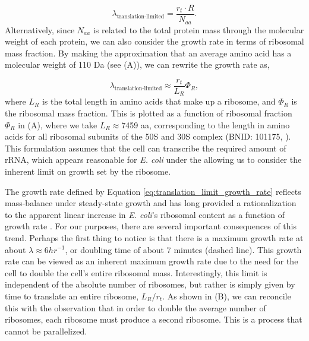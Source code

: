 \begin{equation}
\lambda_{\textrm{translation-limited}} = \frac{r_t \cdot R}{N_{aa}}.
\end{equation}
Alternatively, since $N_{aa}$ is related to the total protein mass through the
molecular weight of each protein, we can also consider the growth rate in terms
of ribosomal mass fraction. By making the approximation that an average amino
acid has a molecular weight of 110 Da (see (A)), we can
rewrite the growth rate as,

\begin{equation}
\lambda_{\textrm{translation-limited}} \approx \frac{r_t}{L_R}  \Phi_R,
\label{eq:translation_limit_growth_rate}
\end{equation}
where $L_R$ is the total length in amino acids that make up a ribosome, and
$\Phi_R$ is the ribosomal mass fraction. This is plotted as a function of
ribosomal fraction $\Phi_R$ in (A), where we take $L_R
\approx $7459 aa, corresponding to the length in amino acids for all ribosomal
subunits of the 50S and 30S complex (BNID: 101175, \citep{milo2010}). This
formulation assumes that the cell can transcribe the required amount of rRNA,
which appears reasonable for  \textit{E. coli} under the  allowing us to
consider the inherent limit on growth set by the ribosome.

The growth rate defined by Equation \ref{eq:translation_limit_growth_rate}
reflects  mass-balance under steady-state growth and has long provided a
rationalization to the apparent linear increase in \textit{E. coli}'s ribosomal
content as a function of growth rate \citep{Goldberger1979, scott2010}. For our
purposes, there are several important consequences of this trend. Perhaps the
first thing to notice is that there is a maximum growth rate at about $\lambda
\approx 6 hr^{-1}$, or doubling time of about 7 minutes (dashed line). This
growth rate can be viewed as an inherent maximum growth rate due to the need for
the cell to double the cell's entire ribosomal mass. Interestingly, this limit
is independent of the absolute number of ribosomes, but rather is simply given
by time to translate an entire ribosome, $L_R/ r_t$. As shown in
(B), we can reconcile this with the observation that in order
to double the average number of ribosomes, each ribosome must produce a second
ribosome. This is a process that cannot be parallelized.

